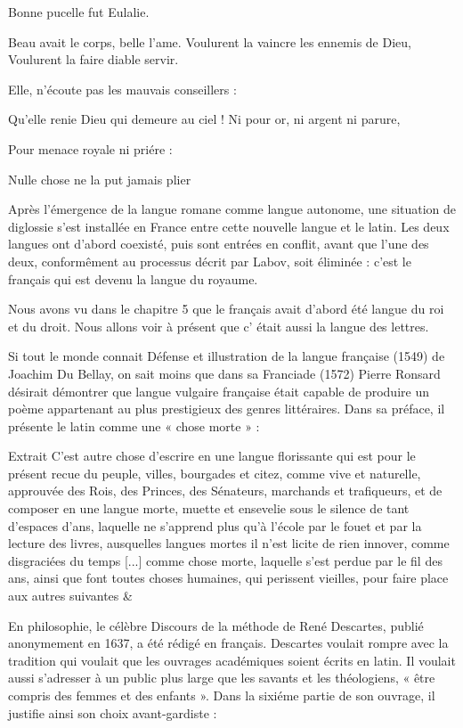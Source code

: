 Bonne pucelle fut Eulalie.


Beau avait le corps, belle l’ame. Voulurent la vaincre les ennemis de Dieu, Voulurent la faire diable servir.


Elle, n’écoute pas les mauvais conseillers :


Qu’elle renie Dieu qui demeure au ciel ! Ni pour or, ni argent ni parure,


Pour menace royale ni priére :


Nulle chose ne la put jamais plier


Après l’émergence de la langue romane comme langue autonome, une situation de diglossie s’est installée en France entre cette nouvelle langue et le latin. Les deux langues ont d’abord coexisté, puis sont entrées en conflit, avant que l’une des deux, conformêment au processus décrit par Labov, soit éliminée : c’est le français qui est devenu la langue du royaume.


Nous avons vu dans le chapitre 5 que le français avait d’abord été langue du roi et du droit. Nous allons voir à présent que c’ était aussi la langue des lettres.



Si tout le monde connait Défense et illustration de la langue française (1549) de Joachim Du Bellay, on sait moins que dans sa Franciade (1572) Pierre Ronsard désirait démontrer que langue vulgaire française était capable de produire un poème appartenant au plus prestigieux des genres littéraires. Dans sa préface, il présente le latin comme une « chose morte » :


\begin{lecture}{Extrait}
C'est autre chose d’escrire en une langue florissante qui est pour le présent recue du peuple, villes, bourgades et citez, comme vive et naturelle, approuvée des Rois, des Princes, des Sénateurs, marchands et trafiqueurs, et de composer en une langue morte, muette et ensevelie sous le silence de tant d’espaces d’ans, laquelle ne s’apprend plus qu’à l’école par le fouet et par la lecture des livres, ausquelles langues mortes il n'est licite de rien innover, comme disgraciées du temps [...] comme chose morte, laquelle s'est perdue par le fil des ans, ainsi que font toutes choses humaines, qui perissent vieilles, pour faire place aux autres suivantes \&
\end{lecture}

En philosophie, le célèbre Discours de la méthode de René Descartes, publié anonymement en 1637, a été rédigé en français. Descartes voulait rompre avec la tradition qui voulait que les ouvrages académiques soient écrits en latin. Il voulait aussi s’adresser à un public plus large que les savants et les théologiens, « être compris des femmes et des enfants ». Dans la sixiéme partie de son ouvrage, il justifie ainsi son choix avant-gardiste :


